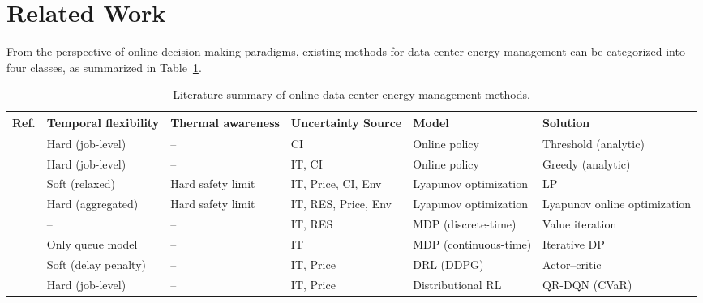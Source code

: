 \documentclass[a4paper,fleqn]{cas-dc}
\theoremstyle{plain}
\theoremstyle{remark}
\theoremstyle{plain}
\begin{document}
\section{Related Work}\label{sec:related_work}

From the perspective of online decision-making paradigms, existing methods for data center energy management can be categorized into four classes, as summarized in Table~\ref{tab:lit_summary}.

\begin{table}[t]
\centering
\caption{Literature summary of online data center energy management methods.}
\label{tab:lit_summary}
\setlength{\tabcolsep}{3pt}
\renewcommand{\arraystretch}{0.97}
\fontsize{8}{9}\selectfont
\renewcommand{\tabularxcolumn}[1]{m{#1}}

\begin{tabularx}{\textwidth}{@{}
    c
    >{\centering\arraybackslash}m{}
    >{\centering\arraybackslash}m{}
    >{\centering\arraybackslash}m{}
    >{\centering\arraybackslash}m{}
    >{\centering\arraybackslash}X
@{}}
\toprule
\textbf{Ref.} & \textbf{Temporal flexibility} & \textbf{Thermal awareness} & \textbf{Uncertainty Source} & \textbf{Model} & \textbf{Solution} \\
\midrule
\cite{lechowicz2023_online_pause_resume} & Hard (job-level) & -- & CI & Online policy & Threshold (analytic) \\
\cite{hanafy2023_carbonscaler} & Hard (job-level) & -- & IT, CI & Online policy & Greedy (analytic) \\
\midrule
\cite{xie2025_low_carbon_workload_thermal} & Soft (relaxed) & Hard safety limit & IT, Price, CI, Env & Lyapunov optimization & LP \\
\cite{gao2024_online_electricity_dvb} & Hard (aggregated) & Hard safety limit & IT, RES, Price, Env & Lyapunov optimization & Lyapunov online optimization \\
\midrule
\cite{chakraborty2025_renewable_overbooking} & -- & -- & IT, RES & MDP (discrete-time) & Value iteration \\
\cite{chitsaz2024_ctmdp_power_mgmt} & Only queue model & -- & IT & MDP (continuous-time) & Iterative DP \\
\cite{ding2026_multi_time_scale_market} & Soft (delay penalty) & -- & IT, Price & DRL (DDPG) & Actor--critic \\
\cite{ding2025_job_scheduling_uncertain} & Hard (job-level) & -- & IT, Price & Distributional RL & QR-DQN (CVaR) \\

\end{tabularx}
\end{table}
\end{document}
